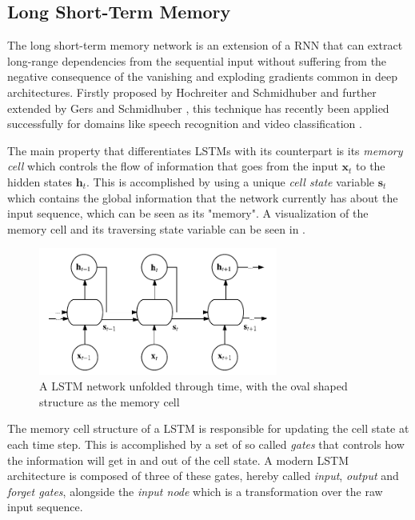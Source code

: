 \documentclass{kththesis}
\begin{document}
\subsection{Long Short-Term Memory}

The long short-term memory network is an extension of a RNN that can extract long-range dependencies from the sequential input without suffering from the negative consequence of the vanishing and exploding gradients common in deep architectures. Firstly proposed by Hochreiter and Schmidhuber \citep{hochreiter1997long} and further extended by Gers and Schmidhuber \citep{gers1999learning}, this technique has recently been applied successfully for domains like speech recognition \citep{graves2013speech} and video classification \citep{yue2015beyond}.

The main property that differentiates LSTMs with its counterpart is its \emph{memory cell} which controls the flow of information that goes from the input $\mathbf{x}_t$ to the hidden states $\mathbf{h}_t$. This is accomplished by using a unique \emph{cell state} variable $\mathbf{s}_t$ which contains the global information that the network currently has about the input sequence, which can be seen as its "memory". A visualization of the memory cell and its traversing state variable can be seen in .

\begin{figure}[h]
    \centering
    \includegraphics[width=0.7\textwidth,keepaspectratio]{figures/lstm.pdf}
    \caption{A LSTM network unfolded through time, with the oval shaped structure as the memory cell}
    \label{fig:lstm}
\end{figure}

The memory cell structure of a LSTM is responsible for updating the cell state at each time step. This is accomplished by a set of so called \emph{gates} that controls how the information will get in and out of the cell state. A modern LSTM architecture is composed of three of these gates, hereby called \emph{input}, \emph{output} and \emph{forget gates}, alongside the \emph{input node} which is a transformation over the raw input sequence. 
\end{document}

